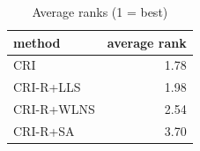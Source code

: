 \begin{table}[htbp]
\centering
\small
\caption{Average ranks (1 = best)}
\label{tab:E5b_ablation_60s_b60_ranks}
\begin{tabular}{lr}
\toprule
method & average rank \\
\midrule
CRI & 1.78 \\
CRI-R+LLS & 1.98 \\
CRI-R+WLNS & 2.54 \\
CRI-R+SA & 3.70 \\
\bottomrule
\end{tabular}
\end{table}
